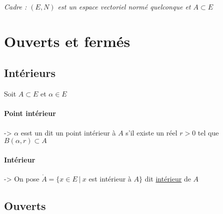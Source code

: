

\textit{Cadre : $(E,N)$ est un espace vectoriel normé quelconque et $A \subset E$}
\minitoc
	\section{Ouverts et fermés}
	\subsection{Intérieurs}
		
		Soit $A\subset E$ et $\alpha\in E$ 
		
		\traitd
		\paragraph{Point intérieur}
			${}$\\ -> $\alpha$ esst un dit un point intérieur à $A$ s'il existe un réel $r>0$ tel que $B(\alpha ,r) \subset A$
		\trait  
		
		\traitd
		\paragraph{Intérieur}
			${}$\\ -> On pose $\mathring{A} = \{x\in E ~\vert ~x$ est intérieur à $A\}$ dit \underline{intérieur} de $A$ \trait
		\vspace*{0.5cm} \\ 
	\subsection{Ouverts}
		\traitd
